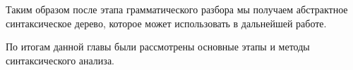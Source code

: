 







Таким образом после этапа грамматического разбора мы получаем абстрактное синтаксическое дерево, которое может использовать в дальнейшей работе.

По итогам данной главы были рассмотрены основные этапы и методы синтаксического анализа.
